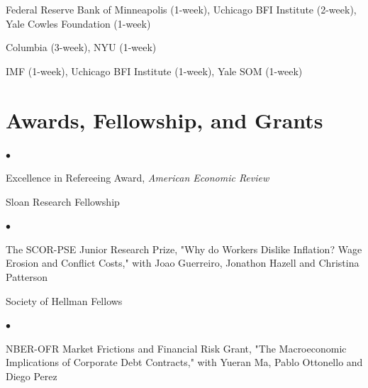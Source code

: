 \documentclass[line]{res}
\newenvironment{list1}{
  \begin{list}{\ding{113}}{%
      \setlength{\itemsep}{0.07in}
      \setlength{\parsep}{0in} \setlength{\parskip}{0in}
		\setlength{\topsep}{0.07in} \setlength{\partopsep}{0in}
      \setlength{\leftmargin}{0.0in}}}{\end{list}}
\newenvironment{list2}{
  \begin{list}{$\bullet$}{%
      \setlength{\itemsep}{0in}
      \setlength{\parsep}{0in} \setlength{\parskip}{0in}
      \setlength{\topsep}{0in} \setlength{\partopsep}{0in} 
      \setlength{\leftmargin}{0in}}}{\end{list}}
\begin{document}
\begin{resume}
\begin{list1}
\item[2024] Federal Reserve Bank of Minneapolis (1-week), Uchicago BFI Institute (2-week), Yale Cowles Foundation (1-week)

\item[2023] Columbia (3-week), NYU (1-week)

\item[2022] IMF (1-week), Uchicago BFI Institute (1-week), Yale SOM (1-week)

\end{list1}

\section{\sc Awards, Fellowship, and Grants}

\begin{list1}
   \item[2026]
   \begin{list2}
   \item[] Excellence in Refereeing Award, \emph{American Economic Review}
   \end{list2}
\end{list1}

\begin{list1}
   \item[2025] Sloan Research Fellowship
   \begin{list2}
   \vspace{0.2cm}
   \item[] The SCOR-PSE Junior Research Prize, "Why do Workers Dislike Inflation? Wage Erosion and Conflict Costs," with Joao Guerreiro, Jonathon Hazell and Christina Patterson
   \vspace{0.2cm}
   \item[] Society of Hellman Fellows
   \end{list2}
\end{list1}

\begin{list1}
   \item[2024] 
   \begin{list2}
   \item[] NBER-OFR Market Frictions and Financial Risk Grant, "The Macroeconomic Implications of Corporate Debt Contracts," with Yueran Ma, Pablo Ottonello and Diego Perez 
    \end{list2}
\end{list1}


\end{resume}
\end{document}

